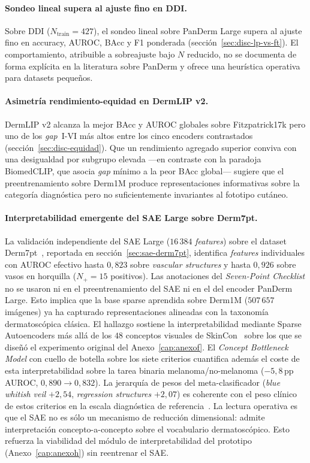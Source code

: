 \paragraph{Sondeo lineal supera al ajuste fino en DDI.}
Sobre DDI ($N_{\mathrm{train}} = 427$), el sondeo lineal sobre PanDerm
Large supera al ajuste fino en accuracy, AUROC, BAcc y F1 ponderada
(sección~\ref{sec:disc-lp-vs-ft}). El comportamiento, atribuible a
sobreajuste bajo $N$ reducido, no se documenta de forma explícita en la
literatura sobre PanDerm y ofrece una heurística operativa para datasets
pequeños.

\paragraph{Asimetría rendimiento-equidad en DermLIP v2.}
DermLIP v2 alcanza la mejor BAcc y AUROC globales sobre Fitzpatrick17k pero
uno de los \emph{gap}~I-VI más altos entre los cinco encoders contrastados
(sección~\ref{sec:disc-equidad}). Que un rendimiento agregado superior
conviva con una desigualdad por subgrupo elevada ---en contraste con la
paradoja BiomedCLIP, que asocia \emph{gap} mínimo a la peor BAcc global---
sugiere que el preentrenamiento sobre Derm1M produce representaciones
informativas sobre la categoría diagnóstica pero no suficientemente
invariantes al fototipo cutáneo.

\paragraph{Interpretabilidad emergente del SAE Large sobre
Derm7pt.}
La validación independiente del SAE Large ($16\,384$
\emph{features}) sobre el dataset Derm7pt~\cite{kawahara2019},
reportada en sección~\ref{sec:sae-derm7pt}, identifica
\emph{features} individuales con AUROC efectivo hasta $0{,}823$
sobre \emph{vascular structures} y hasta $0{,}926$ sobre vasos
en horquilla ($N_{+} = 15$ positivos). Las anotaciones del
\emph{Seven-Point Checklist} no se usaron ni en el preentrenamiento
del SAE ni en el del encoder PanDerm Large. Esto implica que la base
sparse aprendida sobre Derm1M ($507\,657$ imágenes) ya ha
capturado representaciones alineadas con la taxonomía dermatoscópica
clásica. El hallazgo sostiene la interpretabilidad mediante Sparse
Autoencoders más allá de los $48$ conceptos visuales de
SkinCon~\cite{skincon} sobre los que se diseñó el experimento
original del Anexo~\ref{cap:anexof}. El \emph{Concept Bottleneck
Model} con cuello de botella sobre los siete criterios cuantifica
además el coste de esta interpretabilidad sobre la tarea binaria
melanoma/no-melanoma ($-5{,}8$\,pp AUROC, $0{,}890 \to
0{,}832$). La jerarquía de pesos del meta-clasificador
(\emph{blue whitish veil} $+2{,}54$, \emph{regression structures}
$+2{,}07$) es coherente con el peso clínico de estos criterios en
la escala diagnóstica de referencia~\cite{kawahara2019}. La lectura
operativa es que el SAE no es sólo un mecanismo de reducción
dimensional: admite interpretación concepto-a-concepto sobre el
vocabulario dermatoscópico. Esto refuerza la viabilidad del módulo de
interpretabilidad del prototipo (Anexo~\ref{cap:anexoh}) sin
reentrenar el SAE.

